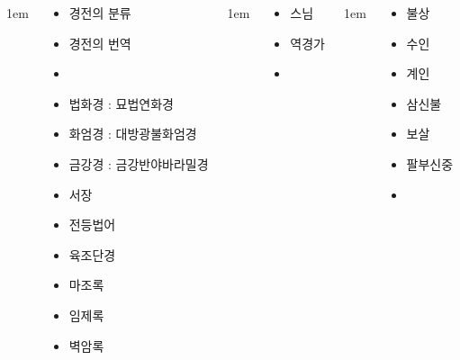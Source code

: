 \documentclass[20pt, a0paper, landscape]{tikzposter}
\begin{document}
\begin{columns}
			{
					\setlength{\leftmargini}{4em}
					\setlength{\labelsep} {1em}
				\begin{LARGE}
					\begin{itemize}
					\item 경전의 분류
					\item 경전의 번역
					\item 
					\item 법화경 : 묘법연화경
					\item 화엄경 : 대방광불화엄경 
					\item 금강경 : 금강반야바라밀경
					\item 서장
					\item 전등법어
					\item  육조단경
					\item  마조록
					\item  임제록
					\item  벽암록
					\end{itemize}
				\end{LARGE}
			} %

			{
					\setlength{\leftmargini}{4em}
					\setlength{\labelsep} {1em}
				\begin{LARGE}
					\begin{itemize}
					\item 스님
					\item 역경가
					\item 
					\end{itemize}
				\end{LARGE}
			} %




			{
					\setlength{\leftmargini}{4em}
					\setlength{\labelsep} {1em}
				\begin{LARGE}
					\begin{itemize}
					\item 불상 
					\item 수인
					\item 계인
					\item 삼신불
					\item 보살
					\item 팔부신중
					\item 


\end{itemize}
\end{LARGE}}
\end{columns}
\end{document}
